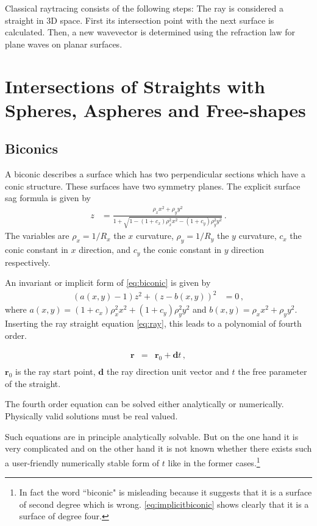 \documentclass[12pt,a4paper,twoside,openright,BCOR10mm,headsepline,titlepage,abstracton,chapterprefix,final]{scrreprt}
\newcommand\Vector[1]{{\mathbf{#1}}}
\newcommand\Location{\Vector{r}}
\newif\ifdraft
\begin{document}
Classical raytracing consists of the following steps: The ray is considered a straight in 3D space. First its intersection point with the next surface is calculated. 
Then, a new wavevector is determined using the refraction law for plane waves on planar surfaces.

\section{Intersections of Straights with Spheres, Aspheres and Free-shapes}\label{subsec:intersectionformulas}

\subsection{Biconics}
A biconic describes a surface which has two perpendicular sections
which have a conic structure. These surfaces have two symmetry planes.
The explicit surface sag formula is given by
\begin{align}
 z &= \frac{\rho_x x^2 + \rho_y y^2}{1 + \sqrt{1 - (1+c_x) \rho_x^2 x^2 - (1+c_y) \rho_y^2 y^2}} \label{eq:biconic}\,.
\end{align}
The variables are $\rho_x = 1/R_x$ the $x$ curvature, $\rho_y = 1/R_y$ the $y$ curvature, $c_x$ the conic constant in $x$ direction,
and $c_y$ the conic constant in $y$ direction respectively. 

An invariant or implicit form of \eqref{eq:biconic} is given by
\begin{align}
 (a(x,y) - 1) z^2 + (z - b(x,y))^2 &= 0\,,\label{eq:implicitbiconic}
\end{align}
where $a(x,y) = (1 + c_x) \rho_x^2 x^2 + (1 + c_y) \rho_y^2 y^2$ and $b(x,y) = \rho_x x^2 + \rho_y y^2$. 
Inserting the ray straight equation \eqref{eq:ray}, this leads to a polynomial of fourth order.

\begin{eqnarray}
 \Location &=& \Location_0 + \Vector{d} t \label{eq:ray}\,,\\
\end{eqnarray}
$\Location_0$ is the ray start point, $\Vector{d}$ the ray direction unit vector and $t$ the free parameter of the straight.

The fourth order equation can be solved either analytically or numerically.
Physically valid solutions must be real valued.

\ifdraft
Such equations are in principle analytically solvable. But on the one hand it is very complicated and on the other hand 
it is not known whether there exists such a user-friendly numerically stable form of $t$ like in the former cases.\footnote{
In fact the word ``biconic" is misleading because it suggests that
it is a surface of second degree which is wrong. \eqref{eq:implicitbiconic}
shows clearly that it is a surface of degree four.}
\end{document}
